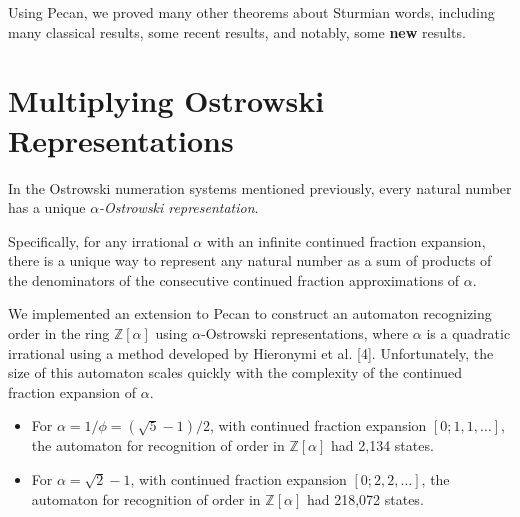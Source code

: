 \documentclass[landscape,usenames,dvipsnames, 25pt]{sciposter}
\begin{document}
\begin{multicols}{3}
Using Pecan, we proved many other theorems about Sturmian words, including many classical results, some recent results, and notably, some \textbf{new} results.
\vspace{-1em}
\section*{Multiplying Ostrowski Representations}

In the Ostrowski numeration systems mentioned previously, every natural number has a unique \emph{$\alpha$-Ostrowski representation}.

Specifically, for any irrational $\alpha$ with an infinite continued fraction expansion, there is a unique way to represent any natural number as a sum of products of the denominators of the consecutive continued fraction approximations of $\alpha$.

We implemented an extension to Pecan to construct an automaton recognizing order in the ring $\mathbb Z [ \alpha ]$ using $\alpha$-Ostrowski representations, where $\alpha$ is a quadratic irrational using a method developed by Hieronymi et al. [4]. 
Unfortunately, the size of this automaton scales quickly with the complexity of the continued fraction expansion of $\alpha$.

\begin{itemize}
    \item For $\alpha = 1/\phi = (\sqrt 5 - 1)/2$, with continued fraction expansion $[0;1,1,\dots]$, the automaton for recognition of order in $\mathbb Z [ \alpha ] $ had 2,134 states.
    
    \item For $\alpha = \sqrt 2 - 1$, with continued fraction expansion $[0;2,2,\dots]$, the automaton for recognition of order in $\mathbb Z [ \alpha ] $ had 218,072 states.
    

\end{itemize}
\end{multicols}
\end{document}
